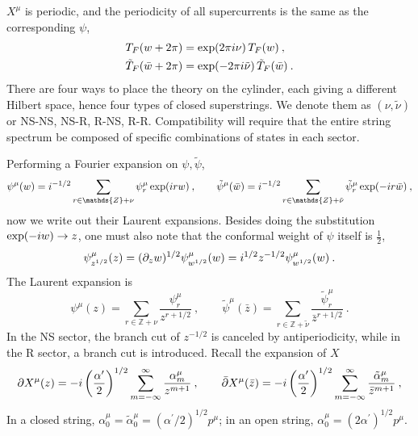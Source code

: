 	$X^{\mu}$ is periodic, and the periodicity of all supercurrents is the same as the corresponding $\psi$,
	\begin{subequations}
		\begin{align}
			T_{F}(w+2\pi) &= \exp(2\pi i\nu)\,T_{F}(w) \:, \label{10.2.4a}\\
			\tilde{T}_{F}(\bar{w}+2\pi) &= \exp(-2\pi i\tilde{\nu})\,\tilde{T}_{F}(\bar{w})\:. \label{10.2.4b}
		\end{align}  \label{10.2.4}
	\end{subequations}
	There are four ways to place the theory on the cylinder, each giving a different Hilbert space, hence four types of closed superstrings. We denote them as $(\nu,\tilde{\nu})$ or NS-NS, NS-R, R-NS, R-R. Compatibility will require that the entire string spectrum be composed of specific combinations of states in each sector.
	
	Performing a Fourier expansion on $\psi,\tilde{\psi}$,
	\begin{equation}
		\psi^{\mu}(w) =\mi^{-1/2} \sum_{r\in\mathds{Z}+\nu}\psi^{\mu}_{r}\exp(\mi r w)\:, \qquad
		\tilde{\psi}^{\mu}(\bar{w})=\mi^{-1/2} \sum_{r\in\mathds{Z}+\tilde{\nu}}\tilde{\psi}^{\mu}_{r}\exp(-\mi r\bar{w})\:,
		\label{10.2.5}
	\end{equation}
	now we write out their Laurent expansions. Besides doing the substitution $\exp(-i w)\to z$, one must also note that the conformal weight of $\psi$ itself is $\frac{1}{2}$,
	\begin{equation}
		\psi^{\mu}_{z^{1/2}}(z)=(\partial_{z}w)^{1/2}\psi_{w^{1/2}}^{\mu}(w)
		=i^{1/2}z^{-1/2}\psi^{\mu}_{w^{1/2}}(w) \:. \label{10.2.6}
	\end{equation}
	The Laurent expansion is
	\begin{equation}
		\psi^{\mu}(z) = \sum_{r\in\mathds{Z}+\nu}\frac{\psi^{\mu}_{r}}{z^{r+1/2}}\:, \qquad
		\tilde{\psi}^{\mu}(\bar{z})=\sum_{r\in\mathds{Z}+\tilde{\nu}}\frac{\tilde{\psi}^{\mu}_{r}}{\bar{z}^{r+1/2}}\:.
		\label{10.2.7}
	\end{equation}
	In the NS sector, the branch cut of $z^{-1/2}$ is canceled by antiperiodicity, while in the R sector, a branch cut is introduced. Recall the expansion of $X$
	\begin{equation}
		\partial X^{\mu}(z)=-i\left(\frac{\alpha^{\prime}}{2}\right)^{1/2} \sum_{m=-\infty}^{\infty}\frac{\alpha_{m}^{\mu}}{z^{m+1}} \:, \qquad
		\bar{\partial} X^{\mu}(\bar{z}) =-i\left(\frac{\alpha^{\prime}}{2}\right)^{1/2} \sum_{m=-\infty}^{\infty}
		\frac{\tilde{\alpha}_{m}^{\mu}}{\bar{z}^{m+1}} \:, \label{10.2.8}
	\end{equation}
	In a closed string, $\alpha^{\mu}_{0}=\tilde{\alpha}_{0}^{\mu}=(\alpha^{\prime}/2)^{1/2}p^{\mu}$; in an open string, $\alpha^{\mu}_{0}=(2\alpha^{\prime})^{1/2}p^{\mu}$.
	

